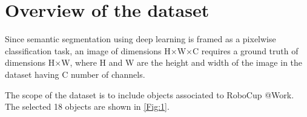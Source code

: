 \documentclass[paper=a4,11pt,parskip=half,toc=listof]{scrartcl}
\begin{document}


\newpage
\setcounter{page}{3} 
\begin{spacing}{1.14}
\tableofcontents
\end{spacing}

\clearpage{}
\listoftables %
\clearpage{}
\listoffigures %
\clearpage{}
\clearpage{}

\setcounter{tocdepth}{4} 
\setcounter{secnumdepth}{4}
\setlength\parindent{0pt}  %



\newpage
\section{Overview of the dataset}
Since semantic segmentation using deep learning is framed as a pixelwise classification task, an image of dimensions H$\times$W$\times$C requires a ground truth of dimensions H$\times$W, where H and W are the height and width of the image in the dataset having C number of channels. 

The scope of the dataset is to include objects associated to RoboCup @Work. The selected 18 objects are shown in \ref{Fig:1}.
\end{document}
